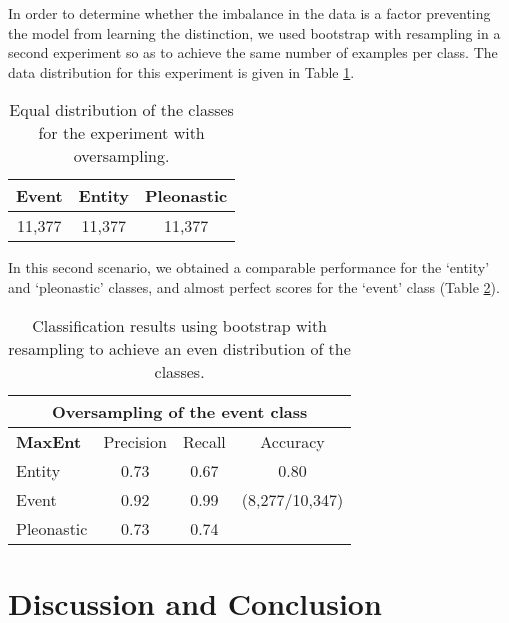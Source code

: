 \documentclass[10pt, a4paper]{article}
\begin{document}

In order to determine whether the imbalance in the data is a factor preventing the model 
from learning the distinction, we used bootstrap with resampling in a second experiment so as to achieve the same number of examples per class. The data distribution for this experiment is given in Table \ref{tab:resamplingdata}.

\begin{table}[h!]\centering
\begin{tabular}{ccc}
\toprule
\textbf{Event} & \textbf{Entity} & \textbf{Pleonastic} \\
\midrule
11,377 & 11,377 & 11,377 \\
\bottomrule
\end{tabular}
\caption{Equal distribution of the classes for the experiment with 
oversampling.}\label{tab:resamplingdata}
\end{table}

In this second scenario, we obtained a comparable performance for the `entity' and `pleonastic' classes, and almost perfect scores for the `event' class (Table \ref{tab:maxentoversampling}). 

\begin{center} \begin{table}[h!] \begin{tabular}{lccc}
\multicolumn{4}{c}{\textbf{Oversampling of the event class}}\\ 
\toprule
\textbf{MaxEnt}& Precision & Recall & Accuracy \\ 
\midrule 
 Entity & 0.73 &0.67& 0.80 \\ 
 Event & 0.92 & 0.99 & (8,277/10,347) \\ 
  Pleonastic &  0.73 & 0.74 & \\
\bottomrule 
\end{tabular} 
\caption{Classification results using bootstrap with 
resampling to achieve an even distribution of the classes.}\label{tab:maxentoversampling}
\end{table}
\end{center}





\section{Discussion and Conclusion}
\end{document}
